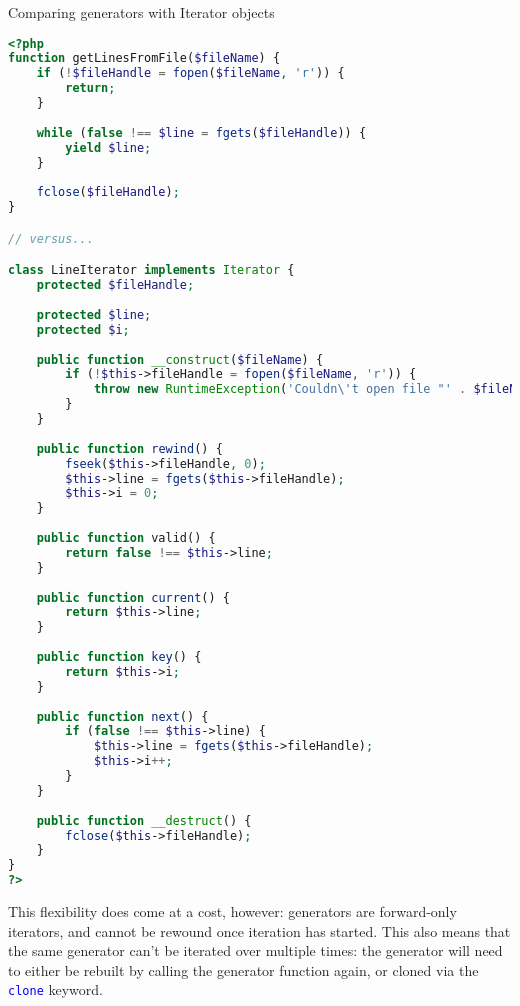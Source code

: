 \begin{example}
Comparing generators with Iterator objects
\begin{lstlisting}[language=PHP]
<?php
function getLinesFromFile($fileName) {
    if (!$fileHandle = fopen($fileName, 'r')) {
        return;
    }
 
    while (false !== $line = fgets($fileHandle)) {
        yield $line;
    }
 
    fclose($fileHandle);
}

// versus...

class LineIterator implements Iterator {
    protected $fileHandle;
 
    protected $line;
    protected $i;
 
    public function __construct($fileName) {
        if (!$this->fileHandle = fopen($fileName, 'r')) {
            throw new RuntimeException('Couldn\'t open file "' . $fileName . '"');
        }
    }
 
    public function rewind() {
        fseek($this->fileHandle, 0);
        $this->line = fgets($this->fileHandle);
        $this->i = 0;
    }
 
    public function valid() {
        return false !== $this->line;
    }
 
    public function current() {
        return $this->line;
    }
 
    public function key() {
        return $this->i;
    }
 
    public function next() {
        if (false !== $this->line) {
            $this->line = fgets($this->fileHandle);
            $this->i++;
        }
    }
 
    public function __destruct() {
        fclose($this->fileHandle);
    }
}
?>
\end{lstlisting}
\end{example}

This flexibility does come at a cost, however: generators are forward-only iterators, and cannot be rewound once iteration has started. This also means that the same generator can't be iterated over multiple times: the generator will need to either be rebuilt by calling the generator function again, or cloned via the \textcolor{Blue}{\texttt{clone}} keyword.


\begin{example}

\begin{lstlisting}[language=PHP]

\end{lstlisting}
\end{example}





